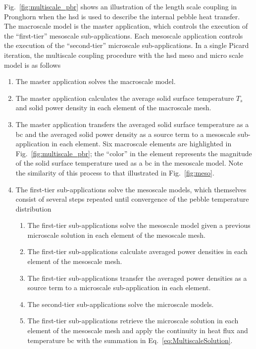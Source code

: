 Fig.\ \ref{fig:multiscale_pbr} shows an illustration of the length scale coupling in Pronghorn when the \gls{hsd} is used to describe the internal pebble heat transfer. The macroscale model is the master application, which controls the execution of the ``first-tier'' mesoscale sub-applications. Each mesoscale application controls the execution of the ``second-tier'' microscale sub-applications. In a single Picard iteration, the multiscale coupling procedure with the \gls{hsd} meso and micro scale model is as follows\mdash

\begin{enumerate}
\itemsep0.3em
\item The master application solves the macroscale model.
\item The master application calculates the average solid surface temperature \(T_s\) and solid power density in each element of the macroscale mesh.
\item The master application transfers the averaged solid surface temperature as a \gls{bc} and the averaged solid power density as a source term to a mesoscale sub-application in each element. Six macroscale elements are highlighted in Fig.\ \ref{fig:multiscale_pbr}; the ``color'' in the element represents the magnitude of the solid surface temperature used as a \gls{bc} in the mesoscale model. Note the similarity of this process to that illustrated in Fig.\ \ref{fig:meso}.
\item The first-tier sub-applications solve the mesoscale models, which themselves consist of several steps repeated until convergence of the pebble temperature distribution\mdash
	\begin{enumerate}
  \itemsep0.3em
	\item The first-tier sub-applications solve the mesoscale model given a previous microscale solution in each element of the mesoscale mesh.
	\item The first-tier sub-applications calculate averaged power densities in each element of the mesoscale mesh.
	\item The first-tier sub-applications transfer the averaged power densities as a source term to a microscale sub-application in each element.
	\item The second-tier sub-applications solve the microscale models.
	\item The first-tier sub-applications retrieve the microscale solution in each element of the mesoscale mesh and apply the continuity in heat flux and temperature \gls{bc} with the summation in Eq.\ \eqref{eq:MultiscaleSolution}.
	\end{enumerate}
\end{enumerate}

